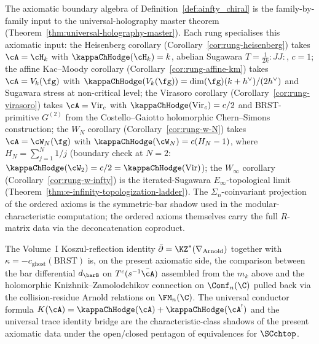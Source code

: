 \begin{remark}
\label{rem:axioms-holography-anchor}%
%
The axiomatic boundary algebra of
Definition~\ref{def:ainfty_chiral} is the family-by-family input
to the universal-holography master theorem
(Theorem~\ref{thm:universal-holography-master}).
Each rung specialises this axiomatic input:
the Heisenberg corollary (Corollary~\ref{cor:rung-heisenberg})
takes $\cA = \cH_k$ with $\kappaChHodge(\cH_k) = k$, abelian Sugawara
$T = \tfrac{1}{2k}{:}JJ{:}$, $c = 1$;
the affine Kac--Moody corollary
(Corollary~\ref{cor:rung-affine-km}) takes $\cA = V_k(\fg)$ with
$\kappaChHodge(V_k(\fg)) = \dim(\fg)(k+h^\vee)/(2h^\vee)$ and Sugawara
stress at non-critical level;
the Virasoro corollary (Corollary~\ref{cor:rung-virasoro})
takes $\cA = \mathrm{Vir}_c$ with
$\kappaChHodge(\mathrm{Vir}_c) = c/2$ and BRST-primitive $G^{(2)}$
from the Costello--Gaiotto holomorphic Chern--Simons construction;
the $W_N$ corollary (Corollary~\ref{cor:rung-w-N}) takes
$\cA = \cW_N(\fg)$ with $\kappaChHodge(\cW_N) = c(H_N - 1)$, where
$H_N = \sum_{j=1}^N 1/j$ (boundary check at $N=2$:
$\kappaChHodge(\cW_2) = c/2 = \kappaChHodge(\mathrm{Vir})$); the
$W_\infty$ corollary (Corollary~\ref{cor:rung-w-infty}) is the
iterated-Sugawara $E_\infty$-topological limit
(Theorem~\ref{thm:e-infinity-topologization-ladder}). The
$\Sigma_n$-coinvariant projection of the ordered axioms is the
symmetric-bar shadow used in the modular-characteristic
computation; the ordered axioms themselves carry the full
$R$-matrix data via the deconcatenation coproduct.

The Volume~I Koszul-reflection identity
$\bar\partial = \KZ^*(\nabla_{\mathrm{Arnold}})$ together with
$\kappa = -c_{\mathrm{ghost}}(\mathrm{BRST})$ is, on the
present axiomatic side, the comparison between the bar
differential $d_{\barB}$ on $T^c(s^{-1}\bar\cA)$ assembled from
the $m_k$ above and the holomorphic Knizhnik--Zamolodchikov
connection on $\Conf_n(\C)$ pulled back via the collision-residue
Arnold relations on $\FM_n(\C)$. The universal conductor formula
$K(\cA) = \kappaChHodge(\cA) + \kappaChHodge(\cA^!)$ and the universal
trace identity bridge are the characteristic-class shadows of
the present axiomatic data under the open/closed pentagon of
equivalences for $\SCchtop$.
\end{remark}

